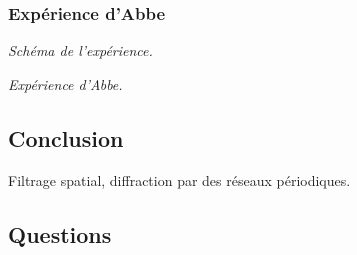\subsubsection{Expérience d'Abbe}

\emph{Schéma de l'expérience.}

\emph{Expérience d'Abbe.}

\subsection{Conclusion}

Filtrage spatial, diffraction par des réseaux périodiques.

\subsection{Questions}